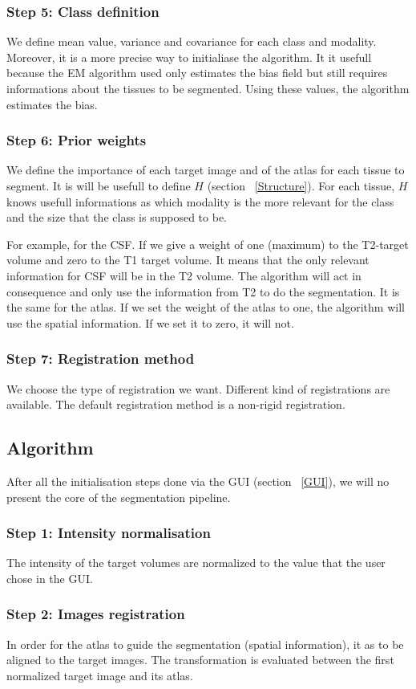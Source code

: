 \subsubsection{Step 5: Class definition}
We define mean value, variance and covariance for each class and modality. Moreover, it is a more precise way to initialiase the algorithm. It it usefull because the EM algorithm used only estimates the bias field but still requires informations about the tissues to be segmented. Using these values, the algorithm estimates the bias.
%
\subsubsection{Step 6: Prior weights}
We define the importance of each target image and of the atlas for each tissue to segment. It is will be usefull to define $H$ (section ~\ref{Structure}). For each tissue, $H$ knows usefull informations as which modality is the more relevant  for the class and the size that the class is supposed to be.
\par
For example, for the CSF. If we give a weight of one (maximum) to the T2-target volume and zero to the T1 target volume. It means that the only relevant information for CSF will be in the T2 volume. The algorithm will act in consequence and only use the information from T2 to do the segmentation. It is the same for the atlas. If we set the weight of the atlas to one, the algorithm will use the spatial information. If we set it to zero, it will not.
%
\subsubsection{Step 7: Registration method}
We choose the type of registration we want. Different kind of registrations are available. The default registration method is a non-rigid registration.

%
\subsection{Algorithm}
After all the initialisation steps done via the GUI (section ~\ref{GUI}), we will no present the core of the segmentation pipeline.
%
\subsubsection{Step 1: Intensity normalisation}
The intensity of the target volumes are normalized to the value that the user chose in the GUI.
%
\subsubsection{Step 2: Images registration}
In order for the atlas to guide the segmentation (spatial information), it as to be aligned to the target images. The transformation is evaluated between the first normalized target image and its atlas.
%
